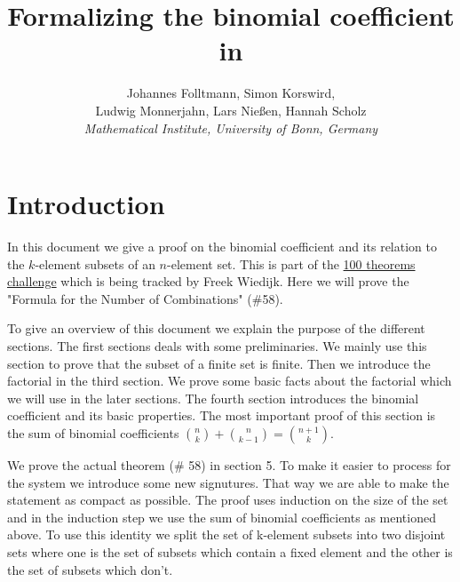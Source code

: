 \documentclass{article}
\begin{document}
\newcommand{\Prod}[3]{#1_{#2} \cdots #1_{#3}}
\newcommand{\Seq}[2]{\{#1,\dots,#2\}}
\newcommand{\FinSet}[3]{\{#1_{#2},\dots,#1_{#3}\}}
\newcommand{\Primes}{\mathbb{P}}
\newcommand{\pow}{{\cal P}}
\newcommand{\range}{\operatorname{ran}}
\newcommand{\inv}[1]{#1^{-1}}
\newcommand{\sset}[2]{\{#1\}_{#2}}

\title{Formalizing the binomial coefficient in \Naproche{}}

\author{Johannes Folltmann, Simon Korswird,\\
Ludwig Monnerjahn, Lars Nießen, Hannah Scholz\\
\emph{Mathematical Institute, University of Bonn, Germany}
}

\maketitle

\section{Introduction}
In this document we give a proof on the binomial coefficient and its relation to the $k$-element subsets of an $n$-element set.
This is part of the \href{https://www.cs.ru.nl/~freek/100/}{100 theorems challenge} which is being tracked by Freek Wiedijk. Here we will prove the "Formula for the Number of Combinations"
(\#58). 

To give an overview of this document we explain the purpose of the different sections. 
The first sections deals with some preliminaries. We mainly use this section to prove that the subset of a finite set is finite.
Then we introduce the factorial in the third section.
We prove some basic facts about the factorial which we will use in the later sections. The fourth section introduces 
the binomial coefficient and its basic properties. The most important proof of this section is the sum of binomial coefficients $\binom{n}{k} + \binom{n}{k-1} = \binom{n+1}{k}$.

We prove the actual theorem (\# 58) in section 5. To make it easier to process for the \Naproche system we introduce some new signutures. 
That way we are able to make the statement as compact as possible. The proof uses induction on the size of the set
and in the induction step we use the sum of binomial coefficients as mentioned above. To use this identity we split the set of k-element subsets
into two disjoint sets where one is the set of subsets which contain a fixed element and the other is the set of subsets which don't. 
\end{document}
